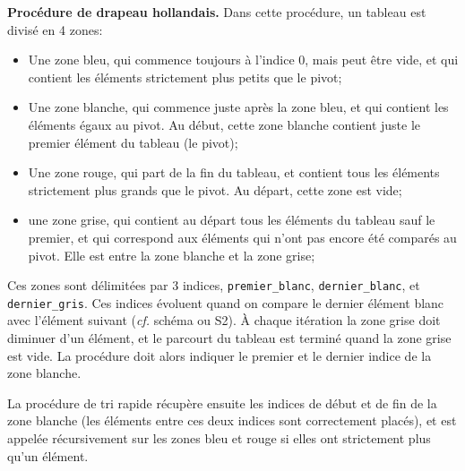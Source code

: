 \question \textbf{Procédure de drapeau hollandais.} Dans cette
procédure, un tableau est divisé en 4 zones:
\begin{itemize}
\item Une zone bleu, qui commence toujours à l'indice 0, mais peut
  être vide, et qui contient les éléments strictement plus petits que
  le pivot;
\item Une zone blanche, qui commence juste après la zone bleu, et qui
  contient les éléments égaux au pivot. Au début, cette zone blanche
  contient juste le premier élément du tableau (le pivot);
\item Une zone rouge, qui part de la fin du tableau, et contient tous
  les éléments strictement plus grands que le pivot. Au départ, cette
  zone est vide;
\item une zone grise, qui contient au départ tous les éléments du
  tableau sauf le premier, et qui correspond aux éléments qui n'ont
  pas encore été comparés au pivot. Elle est entre la zone blanche et
  la zone grise;
\end{itemize}
Ces zones sont délimitées par 3 indices, \texttt{premier\_blanc},
\texttt{dernier\_blanc}, et \texttt{dernier\_gris}.  Ces indices
évoluent quand on compare le dernier élément blanc avec l'élément
suivant (\textit{cf.} schéma ou S2). À chaque itération la zone grise
doit diminuer d'un élément, et le parcourt du tableau est terminé
quand la zone grise est vide. La procédure doit alors indiquer le
premier et le dernier indice de la zone blanche.

\question La procédure de tri rapide récupère ensuite les indices de
début et de fin de la zone blanche (les éléments entre ces deux
indices sont correctement placés), et est appelée récursivement sur
les zones bleu et rouge si elles ont strictement plus qu'un élément.





